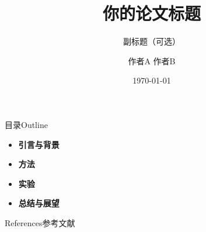 \documentclass[9pt, aspectratio=169]{beamer}
\title{你的论文标题}
\subtitle{副标题（可选）}
\author{作者A \quad 作者B}
\institute{课程名称 / 学院名称}
\date{\today}
\begin{document}
\musttitlepage

\begin{frame}{目录}{Outline}
  \begin{itemize}
    \setlength{\itemsep}{0.4em}
    \item \textbf{引言与背景}
    \item \textbf{方法}
    \item \textbf{实验}
    \item \textbf{总结与展望}
  \end{itemize}
\end{frame}






\begin{frame}[allowframebreaks]{References}{参考文献}
  \footnotesize
  
  
\end{frame}
\end{document}
